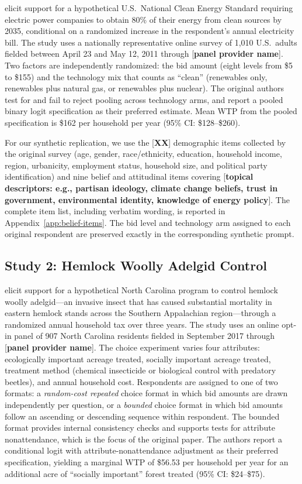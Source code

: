 \documentclass[12pt]{article}
\begin{document}
\textcite{Aldy2012} elicit support for a hypothetical U.S.\ National Clean
Energy Standard requiring electric power companies to obtain 80\% of their
energy from clean sources by 2035, conditional on a randomized increase in
the respondent's annual electricity bill. The study uses a nationally
representative online survey of 1{,}010 U.S.\ adults fielded between
April 23 and May 12, 2011 through [\textbf{panel provider name}]. Two
factors are independently randomized: the bid amount (eight levels from
\$5 to \$155) and the technology mix that counts as ``clean'' (renewables
only, renewables plus natural gas, or renewables plus nuclear). The
original authors test for and fail to reject pooling across technology
arms, and report a pooled binary logit specification as their preferred
estimate. Mean WTP from the pooled specification is \$162 per household
per year (95\% CI: \$128--\$260).

For our synthetic replication, we use the [\textbf{XX}] demographic items
collected by the original survey (age, gender, race/ethnicity, education,
household income, region, urbanicity, employment status, household size,
and political party identification) and nine belief and attitudinal items
covering [\textbf{topical descriptors: e.g., partisan ideology, climate
change beliefs, trust in government, environmental identity, knowledge of
energy policy}]. The complete item list, including verbatim wording, is
reported in Appendix~\ref{app:belief-items}. The bid level and technology
arm assigned to each original respondent are preserved exactly in the
corresponding synthetic prompt.

\subsection{Study 2: Hemlock Woolly Adelgid Control}\label{sec:data-hwa}

\textcite{Giguere2020} elicit support for a hypothetical North Carolina
program to control hemlock woolly adelgid---an invasive insect that has
caused substantial mortality in eastern hemlock stands across the Southern
Appalachian region---through a randomized annual household tax over three
years. The study uses an online opt-in panel of 907 North Carolina
residents fielded in September 2017 through [\textbf{panel provider name}].
The choice experiment varies four attributes: ecologically important
acreage treated, socially important acreage treated, treatment method
(chemical insecticide or biological control with predatory beetles), and
annual household cost. Respondents are assigned to one of two formats: a
\textit{random-cost repeated} choice format in which bid amounts are drawn
independently per question, or a \textit{bounded} choice format in which
bid amounts follow an ascending or descending sequence within respondent.
The bounded format provides internal consistency checks and supports tests
for attribute nonattendance, which is the focus of the original paper.
The authors report a conditional logit with attribute-nonattendance
adjustment as their preferred specification, yielding a marginal WTP of
\$56.53 per household per year for an additional acre of ``socially
important'' forest treated (95\% CI: \$24--\$75).
\end{document}
